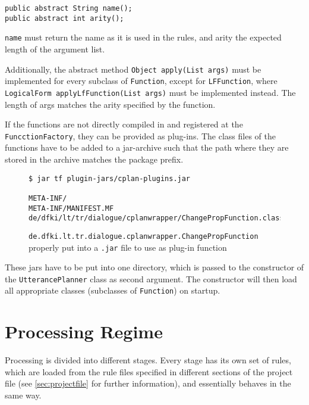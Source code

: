 \documentclass[11pt,a4paper]{report}
\begin{document}
\begin{verbatim}
public abstract String name();
public abstract int arity();
\end{verbatim}

\texttt{name} must return the name as it is used in the rules, and arity the
expected length of the argument list.

Additionally, the abstract method \verb|Object apply(List args)| must be
implemented for every subclass of \texttt{Function}, except for
\texttt{LFFunction}, where \verb|LogicalForm applyLfFunction(List args)|
must be implemented instead. The length of args matches the arity specified by
the function.

If the functions are not directly compiled in and registered at the
\texttt{FuncctionFactory}, they can be provided as plug-ins. The class files
of the functions have to be added to a jar-archive such that the path where
they are stored in the archive matches the package prefix.

\begin{figure}[htbp]
\begin{verbatim}
$ jar tf plugin-jars/cplan-plugins.jar

META-INF/
META-INF/MANIFEST.MF
de/dfki/lt/tr/dialogue/cplanwrapper/ChangePropFunction.class
\end{verbatim}
\caption{\texttt{de.dfki.lt.tr.dialogue.cplanwrapper.ChangePropFunction}
  properly put into a \texttt{.jar} file to use as plug-in function }
\end{figure}

These jars have to be put into one directory, which is passed to the
constructor of the \texttt{UtterancePlanner} class as second argument. The
constructor will then load all appropriate classes (subclasses of
\texttt{Function}) on startup.


\chapter{Processing Regime\label{sec:procregime}}

Processing is divided into different stages. Every stage has its own set of
rules, which are loaded from the rule files specified in different sections of
the project file (see \ref{sec:projectfile} for further information), and
essentially behaves in the same way.
\end{document}
